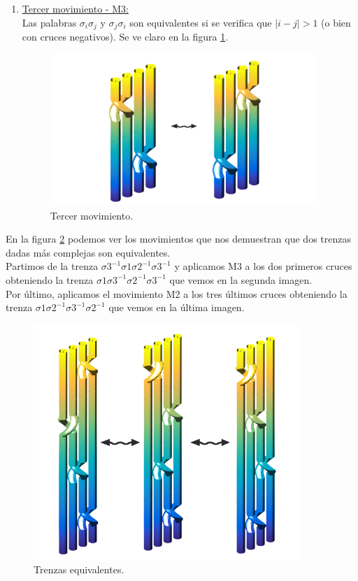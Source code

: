 \begin{enumerate}
		
		\item \underline{Tercer movimiento - M3:} \\
		Las palabras $\sigma_{i} \sigma_{j}$ y $\sigma_{j} \sigma_{i}$ son equivalentes si se verifica que $|i-j| > 1$ (o bien con cruces negativos). Se ve claro en la figura \ref{tren8}.
		\begin{figure}[h!]
			\centering
			\includegraphics[width=10cm]{itrenzas/M3.png}
			\caption{Tercer movimiento.}
			\label{tren8} 
		\end{figure}
		
	\end{enumerate}
	En la figura \ref{tren9} podemos ver los movimientos que nos demuestran que dos trenzas dadas más complejas son equivalentes. \\
	Partimos de la trenza $\sigma3^{-1}\sigma1\sigma2^{-1}\sigma3^{-1}$ y aplicamos M3 a los dos primeros cruces obteniendo la trenza $\sigma1\sigma3^{-1}\sigma2^{-1}\sigma3^{-1}$ que vemos en la segunda imagen. \\
	Por último, aplicamos el movimiento M2 a los tres últimos cruces obteniendo la trenza $\sigma1\sigma2^{-1}\sigma3^{-1}\sigma2^{-1}$ que vemos en la última imagen.\\
	\begin{figure}[h!]
		\centering
		\includegraphics[width=10cm]{itrenzas/movi.png}
		\caption{Trenzas equivalentes.}
		\label{tren9} 
	\end{figure}
	
